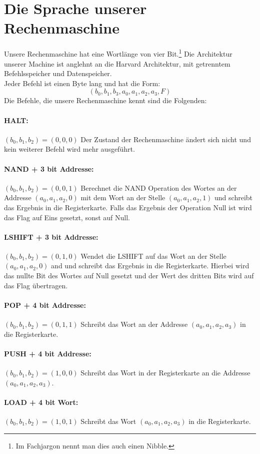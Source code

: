 \documentclass[11pt,a4paper,leqno]{report}
\numberwithin{equation}{chapter}
\begin{document}
\section{Die Sprache unserer Rechenmaschine}
Unsere Rechenmaschine hat eine Wortlänge von vier Bit.\footnote{Im Fachjargon nennt man dies auch einen Nibble.} Die Architektur unserer Machine ist anglehnt an die Harvard Architektur, mit getrenntem Befehlsspeicher und Datenspeicher.\\
Jeder Befehl ist einen Byte lang und hat die Form:
$$(b_0, b_1, b_3, a_0, a_1, a_2, a_3, F)$$
Die Befehle, die unsere Rechenmaschine kennt sind die Folgenden:
\paragraph{HALT:} $(b_0, b_1, b_2) = (0, 0, 0)$ Der Zustand der Rechenmaschine ändert sich nicht und kein weiterer Befehl wird mehr ausgeführt.
\paragraph{NAND + 3 bit Addresse:} $(b_0, b_1, b_2) = (0, 0, 1)$ Berechnet die NAND Operation des Wortes an der Addresse $(a_0, a_1, a_2, 0)$ mit dem Wort an der Stelle $(a_0, a_1, a_2, 1)$ und schreibt das Ergebnis in die Registerkarte. Falls das Ergebnis der Operation Null ist wird das Flag auf Eins gesetzt, sonst auf Null.
\paragraph{LSHIFT + 3 bit Addresse:} $(b_0, b_1, b_2) = (0, 1, 0)$ Wendet die LSHIFT auf das Wort an der Stelle $(a_0, a_1, a_2, 0)$ and und schreibt das Ergebnis in die Registerkarte. Hierbei wird das nullte Bit des Wortes auf Null gesetzt und der Wert des dritten Bits wird auf das Flag übertragen.
\paragraph{POP + 4 bit Addresse:} $(b_0, b_1, b_2) = (0, 1, 1)$ Schreibt das Wort an der Addresse $(a_0, a_1, a_2, a_3)$ in die Registerkarte.
\paragraph{PUSH + 4 bit Addresse:} $(b_0, b_1, b_2) = (1, 0, 0)$ Schreibt das Wort in der Registerkarte an die Addresse $(a_0, a_1, a_2, a_3)$.
\paragraph{LOAD + 4 bit Wort:} $(b_0, b_1, b_2) = (1, 0, 1)$ Schreibt das Wort $(a_0, a_1, a_2, a_3)$ in die Registerkarte.
\end{document}
